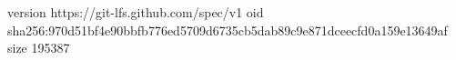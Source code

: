 version https://git-lfs.github.com/spec/v1
oid sha256:970d51bf4e90bbfb776ed5709d6735cb5dab89c9e871dceecfd0a159e13649af
size 195387
